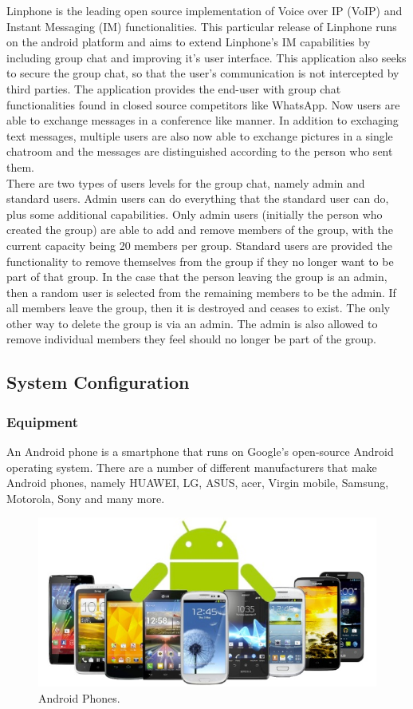 \documentclass[a4paper]{article}
\begin{document}
Linphone is the leading open source implementation of Voice over IP (VoIP) and Instant Messaging (IM) functionalities. This particular release of Linphone runs on the android platform and aims to extend Linphone's IM capabilities by including group chat and improving it's user interface. This application also seeks to secure the group chat, so that the user's communication is not intercepted by third parties. The application provides the end-user with group chat functionalities found in closed source competitors like WhatsApp. Now users are able to exchange messages in a conference like manner. In addition to exchaging text messages, multiple users are also now able to exchange pictures in a single chatroom and the messages are distinguished according to the person who sent them. \\

There are two types of users levels for the group chat, namely admin and standard users. Admin users can do everything that the standard user can do, plus some additional capabilities. Only admin users (initially the person who created the group) are able to add and remove members of the group, with the current capacity being 20 members per group. Standard users are provided the functionality to remove themselves from the group if they no longer want to be part of that group. In the case that the person leaving the group is an admin, then a random user is selected from the remaining members to be the admin. If all members leave the group, then it is destroyed and ceases to exist. The only other way to delete the group is via an admin. The admin is also allowed to remove individual members they feel should no longer be part of the group.

\subsection{System Configuration}

\subsubsection{Equipment}
An Android phone is a smartphone that runs on Google's open-source Android operating system. There are a number of different manufacturers that make Android phones, namely HUAWEI, LG, ASUS, acer, Virgin mobile, Samsung, Motorola, Sony and many more.\\

\begin{center}
\begin{figure}[h]
\centering
\includegraphics[width=0.7\linewidth]{./pictures/android.jpg}
\caption{\label{fig:Agile}Android Phones.}
\end{figure}
\end{center}
\end{document}
